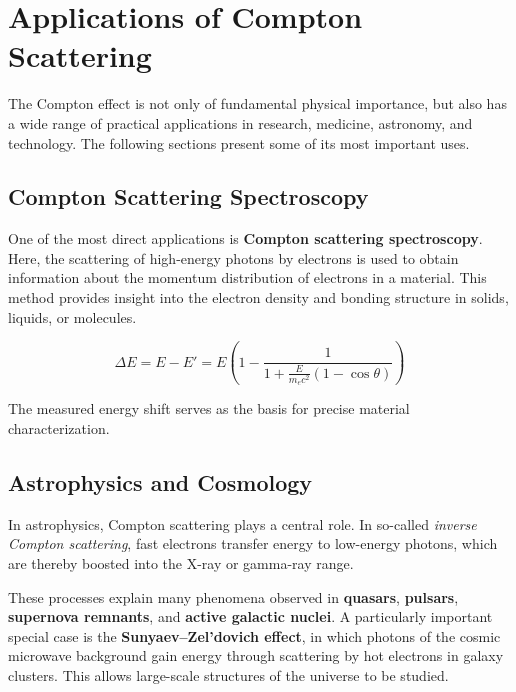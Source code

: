 
\section{Applications of Compton Scattering}

The Compton effect is not only of fundamental physical importance,
but also has a wide range of practical applications in research,
medicine, astronomy, and technology. 
The following sections present some of its most important uses.

\subsection{Compton Scattering Spectroscopy}
One of the most direct applications is \textbf{Compton scattering spectroscopy}.
Here, the scattering of high-energy photons by electrons is used to obtain
information about the momentum distribution of electrons in a material.
This method provides insight into the electron density and bonding structure
in solids, liquids, or molecules.

\[
\Delta E = E - E' = E \left(1 - \frac{1}{1 + \frac{E}{m_e c^2}(1 - \cos \theta)}\right)
\]

The measured energy shift serves as the basis for precise
material characterization.

\subsection{Astrophysics and Cosmology}
In astrophysics, Compton scattering plays a central role.
In so-called \emph{inverse Compton scattering}, fast electrons transfer
energy to low-energy photons, which are thereby boosted into the
X-ray or gamma-ray range.

These processes explain many phenomena observed in
\textbf{quasars}, \textbf{pulsars}, \textbf{supernova remnants}, and
\textbf{active galactic nuclei}.
A particularly important special case is the \textbf{Sunyaev–Zel’dovich effect},
in which photons of the cosmic microwave background gain energy through
scattering by hot electrons in galaxy clusters.
This allows large-scale structures of the universe to be studied.

